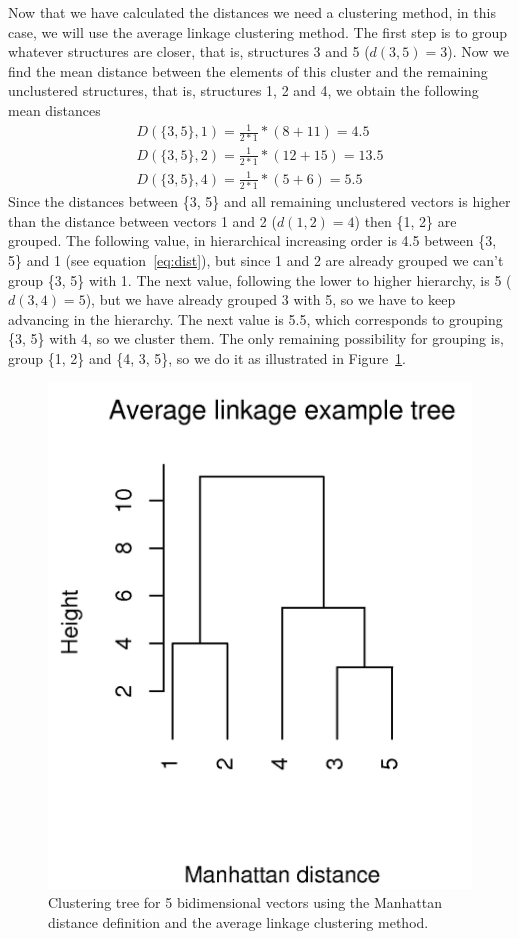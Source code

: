 Now that we have calculated the distances we need a clustering method, in this
case, we will use the average linkage clustering method. The first step is to
group whatever structures are closer, that is, structures 3 and 5
($d(3, 5)=3$). Now we find the mean distance between the elements of
this cluster and the remaining unclustered structures, that is,
structures 1, 2 and 4, we obtain the following mean distances
\begin{gather}
D(\{3,5\}, 1)=\frac{1}{2*1}*(8+11) = 4.5 \label{eq:dist}\\
D(\{3,5\}, 2)=\frac{1}{2*1}*(12+15) = 13.5\\
D(\{3,5\}, 4)=\frac{1}{2*1}*(5+6) = 5.5
\end{gather}
Since the distances between \{3, 5\} and all remaining unclustered
vectors is higher than the distance between vectors 1 and 2
($d(1, 2)=4$) then \{1, 2\} are grouped. The following value, in
hierarchical increasing order is 4.5 between \{3, 5\} and 1 (see
equation~\ref{eq:dist}), but since 1 and 2 are already
grouped we can't group \{3, 5\} with 1. The next value,
following the lower to higher hierarchy, is 5 ($d(3, 4)=5$), but we have
already grouped 3 with 5, so we have to keep advancing in the
hierarchy. The next value is 5.5, which corresponds to grouping \{3,
5\} with 4, so we cluster them. The only remaining possibility for
grouping is, group \{1, 2\} and \{4, 3, 5\}, so we do it as
illustrated in Figure~\ref{fig:tree}.
\begin{figure}[t]
\centering
\includegraphics[scale=0.4]{appendixtree.png}
\caption{Clustering tree for 5 bidimensional vectors using the Manhattan
distance definition and the average linkage clustering method.}
\label{fig:tree}
\end{figure}


